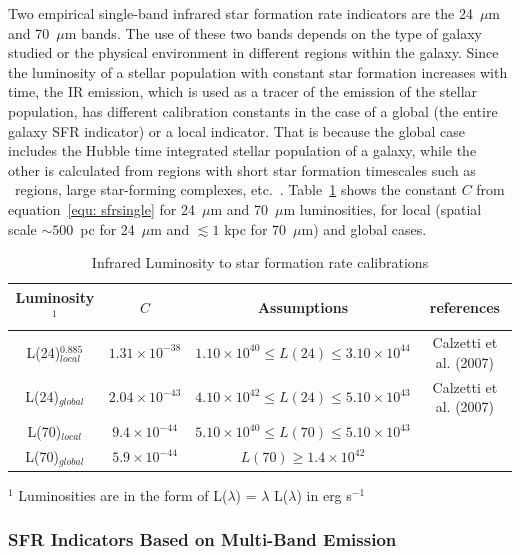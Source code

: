Two empirical single-band infrared star formation rate indicators are the 24~$\mu$m and 70~$\mu$m bands.  
The use of these two bands depends on the type of galaxy studied or the physical environment in different regions within the galaxy. 
Since the luminosity of a stellar population with constant star formation increases with time, the IR emission, which is used as a tracer of the emission of the stellar population, has different calibration constants in the case of a global (the entire galaxy SFR indicator) or a local indicator.
That is because the global case includes the Hubble time integrated stellar population of a galaxy, while the other is calculated from regions with short star formation timescales such as \hii~regions, large star-forming complexes, etc.~\cite{Calzetti13}. %
Table~\ref{table2} shows the constant $C$ from equation~\ref{equ: sfrsingle} for 24~$\mu$m and 70~$\mu$m luminosities, for local (spatial scale $\sim500$~pc for 24~$\mu$m and $\lesssim 1$ kpc for 70~$\mu$m) and global cases. 

\begin{table}
\centering
\caption{Infrared Luminosity to star formation rate calibrations}
\label{table2}
\begin{tabular}{ c c c c }
\hline\hline
Luminosity$^1$ & $C$ & Assumptions & references\\ %
\hline
L(24)$^{0.885}_{local}$ & $1.31 \times 10^{-38}$ &$1.10\times 10^{40} \le L(24) \le 3.10\times 10^{44}$& Calzetti et al. (2007)  \\ %
L(24)$_{global}$ & $2.04 \times 10^{-43}$ &$ 4.10\times 10^{42} \le L(24)  \le 5.10\times 10^{43}$& Calzetti et al. (2007) \\
L(70)$_{local}$ & $9.4 \times 10^{-44} $ &$5.10\times 10^{40} \le  L(70) \le 5.10\times 10^{43}$& \cite{Li12} \\
L(70)$_{global}$& $5.9 \times 10^{-44}$ &$L(70) \ge 1.4 \times 10^{42} $& \cite{Li10}\\
\hline
\end{tabular}
\begin{tablenotes}
\item $^1$ Luminosities are in the form of L($\lambda$) = $\lambda$ L($\lambda$) in erg s$^{-1}$ %
\end{tablenotes}
\end{table}  

\subsubsection*{SFR Indicators Based on Multi-Band Emission}

